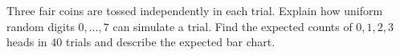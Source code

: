 Three fair coins are tossed independently in each trial. Explain how uniform random digits $0,\ldots,7$ can simulate a trial. Find the expected counts of $0,1,2,3$ heads in $40$ trials and describe the expected bar chart.
